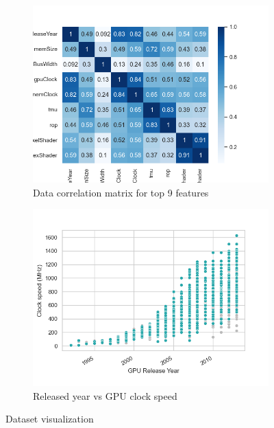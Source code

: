 \documentclass[conference,onecolumn]{IEEEtran}
\begin{document}
    \begin{figure}
        \centering
        \begin{subfigure}{0.49\textwidth}
            \centering
            \includegraphics[width=\linewidth]{Plots/DataCorelation.png}
            \caption{Data correlation matrix for top 9 features}
            \label{fig:datacorrelationmatrix}
        \end{subfigure}
        \hfill
        \begin{subfigure}{0.49\textwidth}
            \centering
            \includegraphics[width=\linewidth]{Plots/DatagpuClockvsmemClock.png}
            \caption{Released year vs GPU clock speed}
            \label{fig:releasedyearvsgpuclockspeed}
        \end{subfigure}
        \caption{Dataset visualization}
        \label{fig:datasetVisualization}
    \end{figure}
\end{document}
